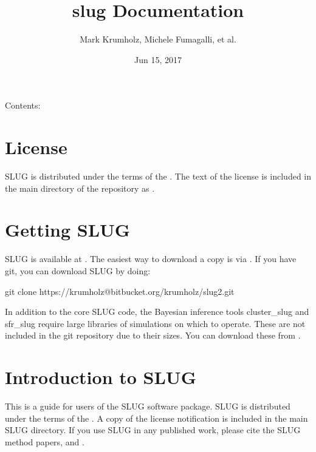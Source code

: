 \documentclass[letterpaper,10pt,english]{sphinxmanual}
\title{slug Documentation}
\date{Jun 15, 2017}
\author{Mark Krumholz, Michele Fumagalli, et al.}
\begin{document}
\maketitle
\sphinxtableofcontents
{}\label{\detokenize{index::doc}}


Contents:


\chapter{License}
\label{\detokenize{license::doc}}\label{\detokenize{license:welcome-to-slug-s-documentation}}\label{\detokenize{license:license}}
SLUG is distributed under the terms of the . The text of the license is included in the main directory of the repository as .


\chapter{Getting SLUG}
\label{\detokenize{getting:getting-slug}}\label{\detokenize{getting::doc}}
SLUG is available at . The easiest way to download a copy is via . If you have git, you can download SLUG by doing:

\begin{sphinxVerbatim}[commandchars=\\\{\}]
git clone https://krumholz@bitbucket.org/krumholz/slug2.git
\end{sphinxVerbatim}

In addition to the core SLUG code, the Bayesian inference tools cluster\_slug and sfr\_slug require large libraries of simulations on which to operate. These are not included in the git repository due to their sizes. You can download these from .


\chapter{Introduction to SLUG}
\label{\detokenize{intro:introduction-to-slug}}\label{\detokenize{intro::doc}}
This is a guide for users of the SLUG software package. SLUG is distributed under the terms of the . A copy of the license notification is included in the main SLUG directory. If you use SLUG in any published work, please cite the SLUG method papers,  and .
\end{document}
